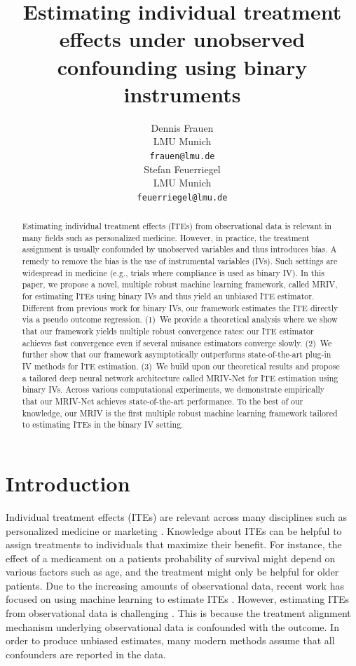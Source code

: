 \documentclass[nonatbib]{article}
\title{Estimating individual treatment effects under unobserved confounding using binary instruments}
\author{%
  Dennis Frauen \\
  LMU Munich\\
  \texttt{frauen@lmu.de} \\
  \And
  Stefan Feuerriegel \\
  LMU Munich \\
  \texttt{feuerriegel@lmu.de}
}
\makeatletter
\newcommand{\settitle}{\@maketitle}
\newcommand{\frameworkname}{MRIV\xspace}
\newcommand{\modelname}{\mbox{MRIV-Net}\xspace}
\theoremstyle{definition}
\theoremstyle{plain}
\makeatother
\begin{document}
\settitle

\begin{abstract}
Estimating individual treatment effects (ITEs) from observational data is relevant in many fields such as personalized medicine. However, in practice, the treatment assignment is usually confounded by unobserved variables and thus introduces bias. A remedy to remove the bias is the use of instrumental variables (IVs). Such settings are widespread in medicine (e.g., trials where compliance is used as binary IV). In this paper, we propose a novel, multiple robust machine learning framework, called \frameworkname, for estimating ITEs using binary IVs and thus yield an unbiased ITE estimator. Different from previous work for binary IVs, our framework estimates the ITE directly via a pseudo outcome regression. (1)~We provide a theoretical analysis where we show that our framework yields multiple robust convergence rates: our ITE estimator achieves fast convergence even if several nuisance estimators converge slowly. (2)~We further show that our framework asymptotically outperforms state-of-the-art plug-in IV methods for ITE estimation. (3)~We build upon our theoretical results and propose a tailored deep neural network architecture called \modelname for ITE estimation using binary IVs. Across various computational experiments, we demonstrate empirically that our \modelname achieves state-of-the-art performance. To the best of our knowledge, our \frameworkname is the first multiple robust machine learning framework tailored to estimating ITEs in the binary IV setting. 
\end{abstract}


\section{Introduction}


Individual treatment effects (ITEs) are relevant across many disciplines such as personalized medicine \cite{Yazdani.2015} or marketing \cite{Varian.2016}. Knowledge about ITEs can be helpful to assign treatments to individuals that maximize their benefit. For instance, the effect of a medicament on a patients probability of survival might depend on various factors such as age, and the treatment might only be helpful for older patients. Due to the increasing amounts of observational data, recent work has focused on using machine learning to estimate ITEs \cite{Shalit.2017, Alaa.2017, Yoon.2018}. However, estimating ITEs from observational data is challenging \cite{Alaa.2018}. This is because the treatment alignment mechanism underlying observational data is confounded with the outcome. In order to produce unbiased estimates, many modern methods assume that all confounders are reported in the data.
\end{document}
